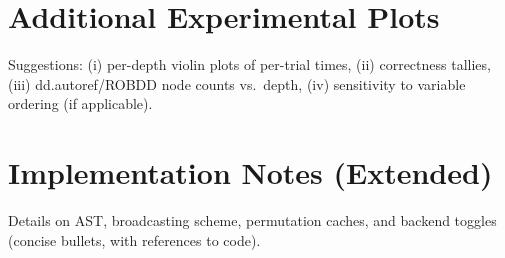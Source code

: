 \documentclass[11pt]{article}
\begin{document}
\section{Additional Experimental Plots}
\label{app:plots}
\noindent Suggestions:
(i) per-depth violin plots of per-trial times,
(ii) correctness tallies,
(iii) dd.autoref/ROBDD node counts vs.\ depth,
(iv) sensitivity to variable ordering (if applicable).

\section{Implementation Notes (Extended)}
\label{app:impl-notes}
Details on AST, broadcasting scheme, permutation caches, and backend toggles (concise bullets, with references to code).
\end{document}
